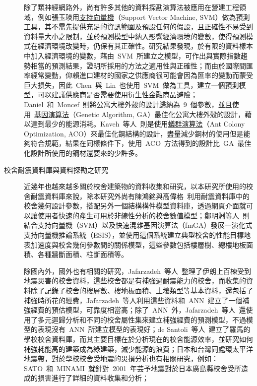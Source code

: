 \begin{description}
  除了類神經網路外，尚有許多其他的資料探勘演算法被應用在營建工程領域，例如張玉瑛\cite{chang2007master}用\underline{支持向量機}（Support Vector Machine, SVM）做為預測工具，其不需先提供充足的資訊範圍及預設任何的假設，且正確性不易受到資料量大小之限制，並於預測模型中納入影響經濟環境的變數，使得預測模式在經濟環境改變時，仍保有其正確性。研究結果發現，於有限的資料樣本中加入經濟環境的變數，藉由~SVM~所建立之模型，可作出與實際指數趨勢相當的預測結果，證明所採用的方法之適用性與正確性；而由於國際間匯率經常變動，仰賴進口建材的國家之供應商很可能會因為匯率的變動而蒙受巨大損失，因此~Chen~與~Lin\cite{chen2010developing}~也使用~SVM~做為工具，建立一個預測模型，可以建議供應商是否需要使用衍生性金融商品避險；Daniel~和~Moncef\cite{tuhus2010genetic}~則將公寓大樓外殼的設計歸納為~9~個參數，並且使用~\underline{基因演算法}（Genetic Algorithm, GA）最佳化公寓大樓外殼的設計，藉以達到最少的能源消耗。Kaveh~等人\cite{kaveh2010performance}~則是使用\underline{蟻群演算法}（Ant Colony Optimization, ACO）來最佳化鋼結構的設計，盡量減少鋼材的使用但是能夠符合規範，結果在同樣條件下，使用~ACO~方法得到的設計比~GA~最佳化設計所使用的鋼材還要來的少許多。

  \item[校舍耐震資料庫與資料探勘之研究]
  近幾年也越來越多關於校舍建築物的資料收集和研究，以本研究所使用的校舍耐震資料庫來說，除本研究外尚有陳鴻銘與高偉格\cite{chen2008computer}~利用耐震資料庫中的校舍幾何設計參數，搭配另外一個結構構件模型資料庫，透過網頁介面就可以讓使用者快速的產生可用於非線性分析的校舍數值模型；鄭明淵等人\cite{chen2012seismic}~則結合支持向量機（SVM）以及快速混雜基因演算法（fmGA）發展一演化式支持向量機推論系統（ESIS），並使用這個系統建立典型校舍的性能目標地表加速度與校舍幾何參數間的關係模型，這些參數包括樓層樹、總樓地板面積、各種牆斷面積、柱斷面積等。

  除國內外，國外也有相關的研究，Jafarzadeh~等人\cite{jafarzadeh2013application}~整理了伊朗上百棟受到地震災害的校舍資料，這些校舍都是有補強過耐震能力的校舍，而收集的資料除了記錄了校舍的樓層數、樓地板面積、土壤類型等基本資料，還包括了補強時所花的經費，Jafarzadeh~等人利用這些資料和~ANN~建立了一個補強經費的預估模型，可靠度相當高；除了~ANN~外，Jafarzadeh~等人\cite{jafarzadeh2013predicting}~還使用了多元迴歸分析和不同的校舍屬性集來建立補強經費的預測模型，不過模型的表現沒有~ANN~所建立模型的表現好；de Santoli~等人\cite{de2014energy}~建立了羅馬的學校校舍資料庫，而其主要目標在於分析現在的校舍能源效率，並研究如何補強耗能高的建築成為綠建築，減少能源的浪費；日本和台灣同處環太平洋地震帶，對於學校校舍受地震的災損分析也有相關研究，例如：SATO~和~MINAMI\cite{SATOShinji:2004-12}~就針對~2001~年芸予地震對於日本廣島縣校舍受所造成的損害進行了詳細的資料收集和分析；






\end{description}